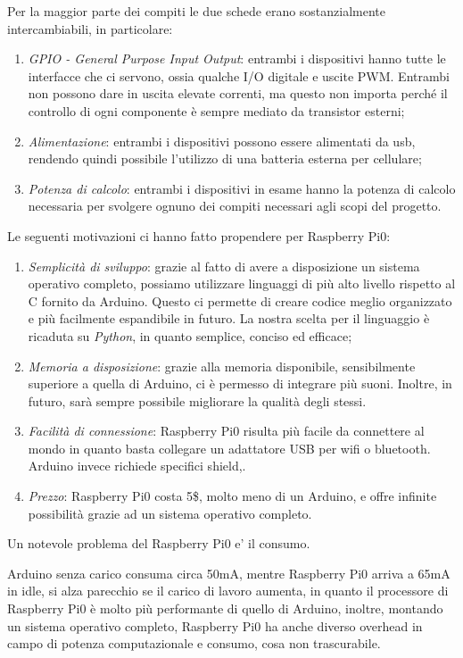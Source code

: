 \documentclass[12pt]{article}
\begin{document}
Per la maggior parte dei compiti le due schede erano sostanzialmente intercambiabili, in particolare:
\begin{enumerate}
\item \emph{GPIO - General Purpose Input Output}: entrambi i dispositivi hanno tutte le interfacce che ci servono, ossia qualche I/O digitale e uscite PWM. Entrambi non possono dare in uscita elevate correnti, ma questo non importa perché il controllo di ogni componente è sempre mediato da transistor esterni;
\item \emph{Alimentazione}: entrambi i dispositivi possono essere alimentati da usb, rendendo quindi possibile l'utilizzo di una batteria esterna per cellulare;
\item \emph{Potenza di calcolo}: entrambi i dispositivi in esame hanno la potenza di calcolo necessaria per svolgere ognuno dei compiti necessari agli scopi del progetto.
\end{enumerate} 

Le seguenti motivazioni ci hanno fatto propendere per Raspberry Pi0:
\begin{enumerate}
\item \emph{Semplicità di sviluppo}: grazie al fatto di avere a disposizione un sistema operativo completo, possiamo utilizzare linguaggi di più alto livello rispetto al C fornito da Arduino. Questo ci permette di creare codice meglio organizzato e più facilmente espandibile in futuro. La nostra scelta per il linguaggio è ricaduta su \emph{Python}, in quanto semplice, conciso ed efficace;
\item \emph{Memoria a disposizione}: grazie alla memoria disponibile, sensibilmente superiore a quella di Arduino, ci è permesso di integrare più suoni. Inoltre, in futuro, sarà sempre possibile migliorare la qualità degli stessi.
\item \emph{Facilità di connessione}: Raspberry Pi0 risulta più facile da connettere al mondo in quanto basta collegare un adattatore USB per wifi o bluetooth. Arduino invece richiede specifici shield,.
\item \emph{Prezzo}: Raspberry Pi0 costa 5\$, molto meno di un Arduino, e offre infinite possibilità grazie ad un sistema operativo completo.
\end{enumerate}

Un notevole problema del Raspberry Pi0 e' il consumo.

Arduino senza carico consuma circa 50mA, mentre Raspberry Pi0 arriva a 65mA in idle, si alza parecchio se il carico di lavoro aumenta, in quanto il processore di Raspberry Pi0 è molto più performante di quello di Arduino, inoltre, montando un sistema operativo completo, Raspberry Pi0 ha anche diverso overhead in campo di potenza computazionale e consumo, cosa non trascurabile.
\end{document}
